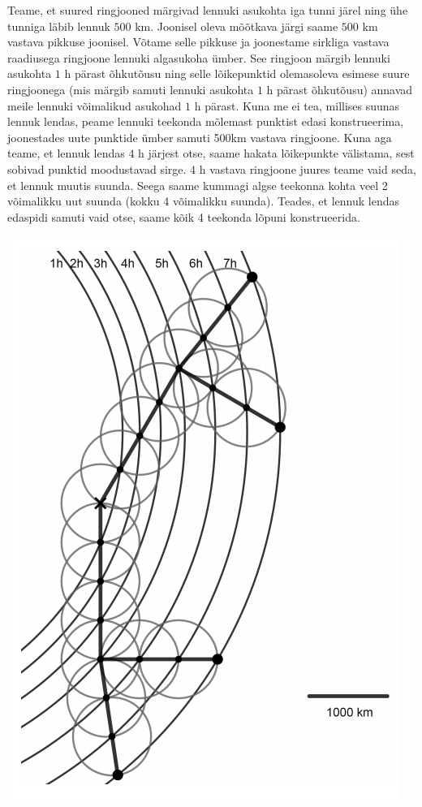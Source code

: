 {\ifSolution
Teame, et suured ringjooned märgivad lennuki asukohta iga tunni järel ning ühe tunniga läbib lennuk $500$ km. Joonisel oleva mõõtkava järgi saame $500$ km vastava pikkuse joonisel. Võtame selle pikkuse ja joonestame sirkliga vastava raadiusega ringjoone lennuki algasukoha ümber. See ringjoon märgib lennuki asukohta $1$ h pärast õhkutõusu ning selle lõikepunktid olemasoleva esimese suure ringjoonega (mis märgib samuti lennuki asukohta $1$ h pärast õhkutõusu) annavad meile lennuki võimalikud asukohad $1$ h pärast. Kuna me ei tea, millises suunas lennuk lendas, peame lennuki teekonda mõlemast punktist edasi konstrueerima, joonestades uute punktide ümber samuti 500km vastava ringjoone. Kuna aga teame, et lennuk lendas $4$ h järjest otse, saame hakata lõikepunkte välistama, sest sobivad punktid moodustavad sirge. $4$ h vastava ringjoone juures teame vaid seda, et lennuk muutis suunda. Seega saame kummagi algse teekonna kohta veel 2 võimalikku uut suunda (kokku 4 võimalikku suunda). Teades, et lennuk lendas edaspidi samuti vaid otse, saame kõik 4 teekonda lõpuni konstrueerida.
\begin{center}
	\includegraphics[width=0.5\linewidth]{2019-v3p-08-lah.PNG}
\end{center}
\fi
}
 
